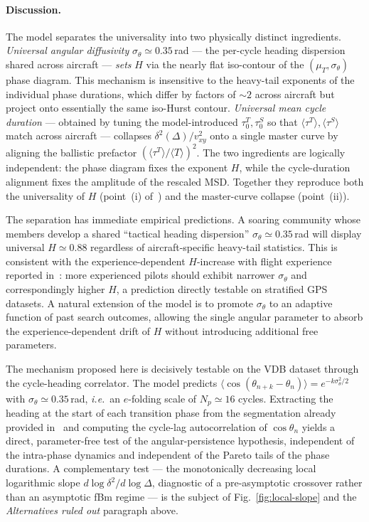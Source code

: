 \documentclass[10pt,twocolumn,a4paper]{article}
\begin{document}
\paragraph*{Discussion.}
The model separates the universality into two physically distinct
ingredients. \emph{Universal angular diffusivity}
$\sigma_\theta\simeq 0.35$\,rad --- the per-cycle heading
dispersion shared across aircraft --- \emph{sets} $H$ via the
nearly flat iso-contour of the $(\mu_T,\sigma_\theta)$ phase
diagram. This mechanism is insensitive to the heavy-tail exponents
of the individual phase durations, which differ by factors of
$\sim 2$ across aircraft but project onto essentially the same
iso-Hurst contour. \emph{Universal mean cycle duration} ---
obtained by tuning the model-introduced $\tau_0^T,\tau_0^S$ so
that $\langle\tau^T\rangle,\langle\tau^S\rangle$ match across
aircraft --- collapses $\delta^2(\Delta)/v_{xy}^2$ onto a single
master curve by aligning the ballistic prefactor
$(\langle\tau^T\rangle/\langle T\rangle)^2$. The two ingredients
are logically independent: the phase diagram fixes the exponent
$H$, while the cycle-duration alignment fixes the amplitude of the
rescaled MSD. Together they reproduce both the universality of $H$
(point~(i) of~\cite{vilpellet2026}) and the master-curve collapse
(point~(ii)).

The separation has immediate empirical predictions. A soaring
community whose members develop a shared ``tactical heading
dispersion'' $\sigma_\theta\simeq 0.35$\,rad will display universal
$H\simeq 0.88$ regardless of aircraft-specific heavy-tail
statistics. This is consistent with the experience-dependent
$H$-increase with flight experience reported
in~\cite{vilpellet2026}: more experienced pilots should exhibit
narrower $\sigma_\theta$ and correspondingly higher $H$, a
prediction directly testable on stratified GPS datasets. A natural
extension of the model is to promote $\sigma_\theta$ to an
adaptive function of past search outcomes, allowing the single
angular parameter to absorb the experience-dependent drift of $H$
without introducing additional free parameters.

The mechanism proposed here is decisively testable on the VDB
dataset through the cycle-heading correlator. The model predicts
$\langle\cos(\theta_{n+k}-\theta_n)\rangle=e^{-k\sigma_\theta^2/2}$
with $\sigma_\theta\simeq 0.35$\,rad, \emph{i.e.}\ an $e$-folding
scale of $N_p\simeq 16$ cycles. Extracting the heading at the
start of each transition phase from the segmentation already
provided in~\cite{vilpellet2026} and computing the cycle-lag
autocorrelation of $\cos\theta_n$ yields a direct, parameter-free
test of the angular-persistence hypothesis, independent of the
intra-phase dynamics and independent of the Pareto tails of the
phase durations. A complementary test --- the monotonically
decreasing local logarithmic slope $d\log\delta^2/d\log\Delta$,
diagnostic of a pre-asymptotic crossover rather than an
asymptotic fBm regime --- is the subject of
Fig.~\ref{fig:local-slope} and the \emph{Alternatives ruled out}
paragraph above.
\end{document}

